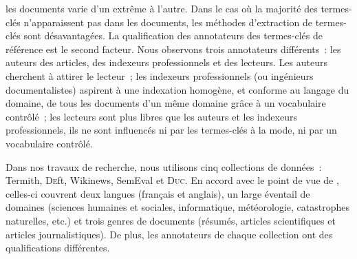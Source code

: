     les documents varie d'un extrême à l'autre. Dans le cas où la majorité des
    termes-clés n'apparaissent pas dans les documents, les méthodes d'extraction
    de termes-clés sont désavantagées. La qualification des annotateurs des
    termes-clés de référence est le second facteur. Nous observons trois
    annotateurs différents~: les auteurs des articles, des indexeurs
    professionnels et des lecteurs. Les auteurs cherchent à attirer le lecteur~;
    les indexeurs professionnels (ou ingénieurs documentalistes) aspirent à une
    indexation homogène, et conforme au langage du domaine, de tous les
    documents d'un même domaine grâce à un vocabulaire contrôlé~; les lecteurs
    sont plus libres que les auteurs et les indexeurs professionnels, ils ne
    sont influencés ni par les termes-clés \og{}à la mode\fg{}, ni par un
    vocabulaire contrôlé.

    Dans nos travaux de recherche, nous utilisons cinq collections de données~:
    Termith, \textsc{De}ft, Wikinews, SemEval et \textsc{Duc}. En accord avec le
    point de vue de , celles-ci couvrent deux
    langues (français et anglais), un large éventail de domaines (sciences
    humaines et sociales, informatique, météorologie, catastrophes naturelles,
    etc.) et trois gen\-res de documents (résumés, articles scientifiques et
    articles journalistiques). De plus, les annotateurs de chaque collection ont
    des qualifications différentes.


